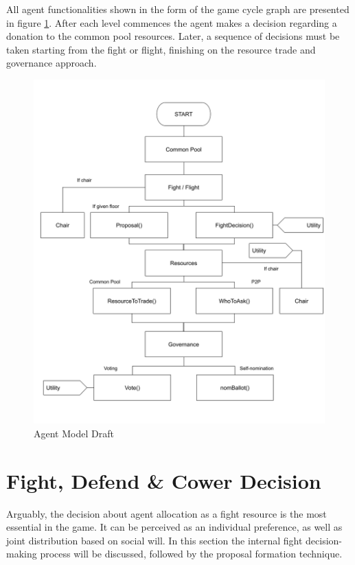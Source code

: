 All agent functionalities shown in the form of the game cycle graph are presented in figure \ref{fig:agent_model}. After each level commences the agent makes a decision regarding a donation to the common pool resources. Later, a sequence of decisions must be taken starting from the fight or flight, finishing on the resource trade and governance approach.

\begin{figure}[htb]
    \centering
    \includegraphics[scale=0.35]{006_team_3_agent_design/FIGS/diagram.png}
    \caption{Agent Model Draft}
    \label{fig:agent_model}
\end{figure}

\clearpage


\section{Fight, Defend \& Cower Decision}


Arguably, the decision about agent allocation as a fight resource is the most essential in the game. It can be perceived as an individual preference, as well as joint distribution based on social will. In this section the internal fight decision-making process will be discussed, followed by the proposal formation technique.


